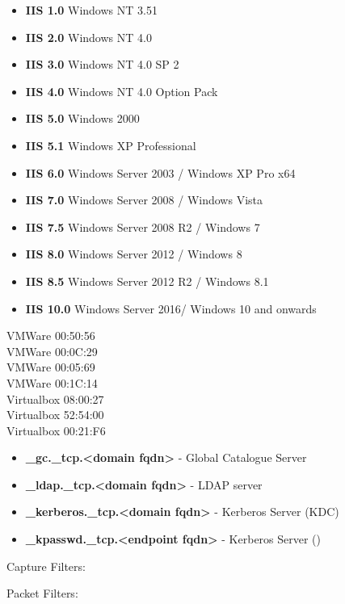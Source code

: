 \documentclass[a4paper,10pt]{article}
\begin{document}
\begin{tcolorbox}[breakable,title=IIS Versions]
\begin{itemize}
	\itemsep0em
	\item \textbf{IIS 1.0} Windows NT 3.51
	\item \textbf{IIS 2.0} Windows NT 4.0
	\item \textbf{IIS 3.0} Windows NT 4.0 SP 2
	\item \textbf{IIS 4.0} Windows NT 4.0 Option Pack
	\item \textbf{IIS 5.0} Windows 2000
	\item \textbf{IIS 5.1} Windows XP Professional
	\item \textbf{IIS 6.0} Windows Server 2003 / Windows XP Pro x64
	\item \textbf{IIS 7.0} Windows Server 2008 / Windows Vista
	\item \textbf{IIS 7.5} Windows Server 2008 R2 / Windows 7
	\item \textbf{IIS 8.0} Windows Server 2012 / Windows 8
	\item \textbf{IIS 8.5} Windows Server 2012 R2 / Windows 8.1
	\item \textbf{IIS 10.0} Windows Server 2016/ Windows 10 and onwards
\end{itemize}
\end{tcolorbox}
\begin{tcolorbox}[breakable,title=Common MAC Address vendors]
VMWare 00:50:56\\
VMWare 00:0C:29\\
VMWare 00:05:69\\
VMWare 00:1C:14\\
Virtualbox 08:00:27	\\
Virtualbox 52:54:00 \\
Virtualbox 00:21:F6
\end{tcolorbox}
\begin{tcolorbox}[breakable,title=Active Directory SRV records]
\begin{itemize}
	\itemsep0em
	\item \textbf{\_gc.\_tcp.<domain fqdn>} - Global Catalogue Server
	\item \textbf{\_ldap.\_tcp.<domain fqdn>} - LDAP server
	\item \textbf{\_kerberos.\_tcp.<domain fqdn>} - Kerberos Server (KDC)
	\item \textbf{\_kpasswd.\_tcp.<endpoint fqdn>} - Kerberos Server ()
\end{itemize}
\end{tcolorbox}
\begin{tcolorbox}[breakable,title=Wireshark Filters]
	Capture Filters:
	
	Packet Filters:
\end{tcolorbox}
\end{document}
